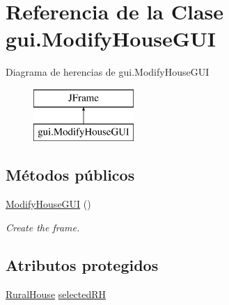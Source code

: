\hypertarget{classgui_1_1_modify_house_g_u_i}{}\section{Referencia de la Clase gui.\+Modify\+House\+G\+UI}
\label{classgui_1_1_modify_house_g_u_i}
Diagrama de herencias de gui.\+Modify\+House\+G\+UI\begin{figure}[H]
\begin{center}
\leavevmode
\includegraphics[height=2.000000cm]{classgui_1_1_modify_house_g_u_i}
\end{center}
\end{figure}
\subsection*{Métodos públicos}
\begin{DoxyCompactItemize}
\item 
\mbox{\hyperlink{classgui_1_1_modify_house_g_u_i_a4639580e463c76396d39474fbcd5cff5}{Modify\+House\+G\+UI}} ()
\begin{DoxyCompactList}\small\item\em Create the frame. \end{DoxyCompactList}\end{DoxyCompactItemize}
\subsection*{Atributos protegidos}
\begin{DoxyCompactItemize}
\item 
\mbox{\hyperlink{classdomain_1_1_rural_house}{Rural\+House}} \mbox{\hyperlink{classgui_1_1_modify_house_g_u_i_a803e872ae00af5f6fd4b87837a44408c}{selected\+RH}}
\end{DoxyCompactItemize}
